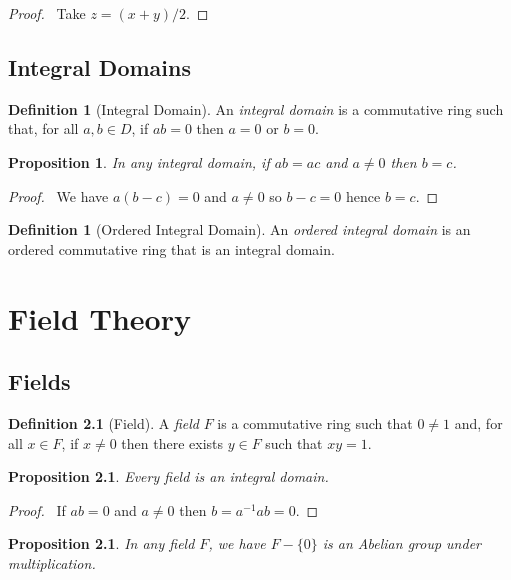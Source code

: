 \documentclass{book}
\let\qed\relax
\newtheorem{prop}[ax]{Proposition}
\theoremstyle{definition}
\newtheorem{df}[ax]{Definition}
\begin{document}
\begin{proof}
\pf\ Take $z = (x + y) / 2$. \qed
\end{proof}

\section{Integral Domains}

\begin{df}[Integral Domain]
An \emph{integral domain} is a commutative ring such that, for all $a,b \in D$, if $ab = 0$ then $a = 0$ or $b = 0$.
\end{df}

\begin{prop}
\label{prop:multcancel}
In any integral domain, if $ab = ac$ and $a \neq 0$ then $b = c$.
\end{prop}

\begin{proof}
\pf\ We have $a(b-c) = 0$ and $a \neq 0$ so $b - c = 0$ hence $b = c$. \qed
\end{proof}

\begin{df}[Ordered Integral Domain]
An \emph{ordered integral domain} is an ordered commutative ring that is an integral domain.
\end{df}

\chapter{Field Theory}

\section{Fields}

\begin{df}[Field]
A \emph{field} $F$ is a commutative ring such that $0 \neq 1$ and, for all $x \in F$, if $x \neq 0$ then there exists $y \in F$ such that $xy = 1$.
\end{df}

\begin{prop}
Every field is an integral domain.
\end{prop}

\begin{proof}
\pf\ If $ab = 0$ and $a \neq 0$ then $b = a^{-1}ab = 0$. \qed
\end{proof}

\begin{prop}
In any field $F$, we have $F - \{0\}$ is an Abelian group under multiplication.
\end{prop}
\end{document}
